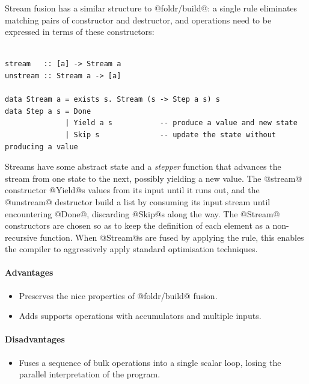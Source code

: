 Stream fusion has a similar structure to @foldr/build@: a single rule
eliminates matching pairs of constructor and destructor, and operations need to
be expressed in terms of these constructors:
%
\begin{lstlisting}[style=Haskell,numbers=none,mathescape,caption={The \emph{stream fusion} transformation}]
%\bf$\langle$ stream fusion $\rangle$% forall s. stream (unstream s) $\mapsto$ s

stream   :: [a] -> Stream a
unstream :: Stream a -> [a]

data Stream a = exists s. Stream (s -> Step a s) s
data Step a s = Done
              | Yield a s           -- produce a value and new state
              | Skip s              -- update the state without producing a value
\end{lstlisting}

Streams have some abstract state and a \emph{stepper} function that advances the
stream from one state to the next, possibly yielding a new value. The
@stream@ constructor @Yield@s values from its input until it runs
out, and the @unstream@ destructor build a list by consuming its input
stream until encountering @Done@, discarding @Skip@s along the
way. The @Stream@ constructors are chosen so as to keep the definition of
each element as a non-recursive function. When @Stream@s are fused by
applying the rule, this enables the compiler to aggressively apply standard
optimisation techniques.

\paragraph{Advantages}
\begin{itemize}
    \item Preserves the nice properties of
        @foldr/build@ fusion.
    \item Adds supports operations with accumulators and multiple inputs.
\end{itemize}

\paragraph{Disadvantages}
\begin{itemize}
    \item Fuses a sequence of bulk operations into a single scalar loop, losing
        the parallel interpretation of the program.
\end{itemize}



